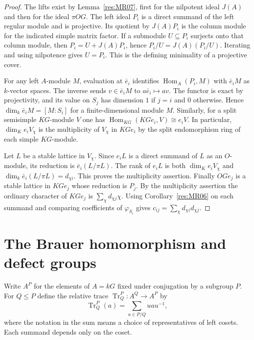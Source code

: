 \documentclass[11pt,oneside,openany]{book}
\theoremstyle{definition}
\theoremstyle{remark}
\begin{document}
\begin{proof}
The lifts exist by Lemma~\ref{res:MR07}, first for the
nilpotent ideal \(J(A)\) and then for the ideal \(\pi OG\).
The left ideal \(P_i\) is a direct summand of the left
regular module and is projective. Its quotient by
\(J(A)P_i\) is the column module for the indicated simple
matrix factor. If a submodule \(U\subseteq P_i\) surjects
onto that column module, then \(P_i=U+J(A)P_i\), hence
\(P_i/U=J(A)(P_i/U)\). Iterating and using nilpotence
gives \(U=P_i\). This is the defining minimality of a
projective cover.

For any left \(A\)-module \(M\), evaluation at \(\bar e_i\)
identifies \(\operatorname{Hom}_A(P_i,M)\) with
\(\bar e_i M\) as \(k\)-vector spaces. The inverse sends
\(v\in\bar e_i M\) to \(a\bar e_i\mapsto av\).
The functor is exact by projectivity, and its value on
\(S_j\) has dimension \(1\) if \(j=i\) and \(0\) otherwise.
Hence \(\dim_k\bar e_i M=[M:S_i]\) for a finite-dimensional
module \(M\). Similarly, for a split semisimple \(KG\)-module
\(V\) one has
\(\operatorname{Hom}_{KG}(KGe_i,V)\cong e_iV\).
In particular, \(\dim_K e_i V_\chi\) is the multiplicity of
\(V_\chi\) in \(KGe_i\) by the split endomorphism ring of
each simple \(KG\)-module.

Let \(L\) be a stable lattice in \(V_\chi\).
Since \(e_iL\) is a direct summand of \(L\) as an
\(O\)-module, its reduction is \(\bar e_i(L/\pi L)\).
The rank of \(e_iL\) is both \(\dim_K e_iV_\chi\)
and \(\dim_k\bar e_i(L/\pi L)=d_{\chi i}\). This proves
the multiplicity assertion. Finally \(OGe_j\) is a stable
lattice in \(KGe_j\) whose reduction is \(P_j\).
By the multiplicity assertion the ordinary character of
\(KGe_j\) is \(\sum_\chi d_{\chi j}\chi\). Using
Corollary~\ref{res:MR06} on each summand and comparing
coefficients of \(\varphi_{S_i}\) gives
\(c_{ij}=\sum_\chi d_{\chi i}d_{\chi j}\).
\end{proof}

\section{The Brauer homomorphism and defect groups}

Write \(A^P\) for the elements of \(A=kG\) fixed under
conjugation by a subgroup \(P\). For \(Q\leq P\) define the
relative trace \(\operatorname{Tr}_Q^P:A^Q\to A^P\) by
\[
 \operatorname{Tr}_Q^P(a)=\sum_{u\in P/Q}uau^{-1},
\]
where the notation in the sum means a choice of representatives
of left cosets. Each summand depends only on the coset.
\end{document}
